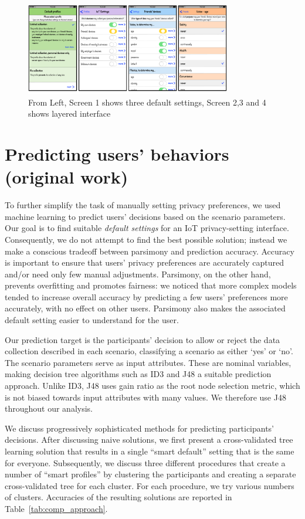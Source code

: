 \begin{figure}
	\centering
	\includegraphics[width=0.8\textwidth]{figures/interface1.pdf}
	\caption{From Left, Screen 1 shows three default settings, Screen 2,3 and 4 shows layered interface}
	\label{fig:interface1}
\end{figure}

\section{Predicting users' behaviors (original work)}\label{sec:predict1}
To further simplify the task of manually setting privacy preferences, we used machine learning to predict users' decisions based on the scenario parameters. Our goal is to find suitable \emph{default settings} for an IoT privacy-setting interface. Consequently, we do not attempt to find the best possible solution; instead we make a conscious tradeoff between parsimony and prediction accuracy. Accuracy is important to ensure that users' privacy preferences are accurately captured and/or need only few manual adjustments. Parsimony, on the other hand, prevents overfitting and promotes fairness: we noticed that more complex models tended to increase overall accuracy by predicting a few users' preferences more accurately, with no effect on other users. Parsimony also makes the associated default setting easier to understand for the user. 

Our prediction target is the participants' decision to allow or reject the data collection described in each scenario, classifying a scenario as either `yes' or `no'. The scenario parameters serve as input attributes. These are nominal variables, making decision tree algorithms such as ID3 and J48 a suitable prediction approach. Unlike ID3, J48 uses gain ratio as the root node selection metric, which is not biased towards input attributes with many values. We therefore use J48 throughout our analysis.

We discuss progressively sophisticated methods for predicting participants' decisions. After discussing naive solutions, we first present a cross-validated tree learning solution that results in a single ``smart default'' setting that is the same for everyone. Subsequently, we discuss three different procedures that create a number of ``smart profiles'' by clustering the participants and creating a separate cross-validated tree for each cluster. For each procedure, we try various numbers of clusters. Accuracies of the resulting solutions are reported in Table~\ref{tab:comp_approach}.

